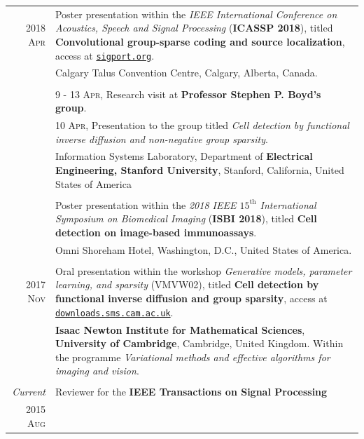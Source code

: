 \documentclass[a4paper,10pt]{article}
\begin{document}
\begin{longtable}[H]{r|p{13.5cm}}
      \textsc{2018 Apr} & Poster presentation within the \emph{IEEE International Conference 
			  on Acoustics, Speech and Signal Processing} (\textbf{ICASSP 2018}), titled
			  \textbf{Convolutional group-sparse coding and source localization}, access at \href{https://sigport.org/documents/convolutional-group-sparse-coding-and-source-localization}{\texttt{sigport.org}}. \\
			& \footnotesize{Calgary Talus Convention Centre, Calgary, Alberta, Canada.} \\
			& \\
			& \textsc{9 - 13 Apr}, Research visit at \textbf{Professor Stephen P. Boyd's group}. \\
			& \textsc{10 Apr}, Presentation to the group titled 
              \emph{Cell detection by functional inverse diffusion and non-negative group sparsity}.\\
			& \footnotesize{Information Systems Laboratory, Department of \textbf{Electrical Engineering, 
			  Stanford University}, Stanford, California, United States of America} \\
			& \\
			& Poster presentation within the \emph{2018 IEEE $15^{\mathrm{th}}$ International
			  Symposium on Biomedical Imaging} (\textbf{ISBI 2018}), titled
			  \textbf{Cell detection on image-based immunoassays}.\\
			& \footnotesize{Omni Shoreham Hotel, Washington, D.C., United States of America.} \\
      \multicolumn{2}{c}{} \\
      
      \textsc{2017 Nov} & Oral presentation within the workshop \emph{Generative models, 
			  parameter learning, and sparsity} (VMVW02), titled
			  \textbf{Cell detection by functional inverse diffusion and group sparsity},
			  access at \href{https://downloads.sms.cam.ac.uk/2600830/2600858.mp4}{\texttt{downloads.sms.cam.ac.uk}}. \\
			& \footnotesize{\textbf{Isaac Newton Institute for Mathematical Sciences},
			  \textbf{University of Cambridge}, Cambridge, United Kingdom.
			  Within the programme \emph{Variational methods and effective
			  algorithms for imaging and vision}.}\\
      \multicolumn{2}{c}{} \\
      
      \emph{Current}	& Reviewer for the \textbf{IEEE Transactions on Signal Processing} \\
      \textsc{2015 Aug} &  \\
      
    \end{longtable}
  
\end{document}
